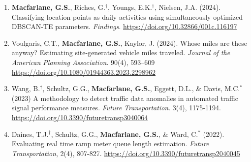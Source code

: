 \documentclass[margin,line]{res}
\newif\ifdetail{}
\newcounter{enuminitialize}
\newenvironment{myenum}[1][]
{%
 \setcounter{enuminitialize}{#1}
 \addtocounter{enuminitialize}{2}
 \begin{enumerate}[left= 4pt, itemsep=8pt, start=\value{enuminitialize}, label=\arabic*\addtocounter{enumi}{-2}]
}
{%
 \end{enumerate}
}
\begin{document}
\begin{resume}
\begin{myenum}[21]

  \item \textbf{Macfarlane, G.S.}, Riches, G.$^\dagger$, Youngs, E.K.$^\dagger$,
  Nielsen, J.A. (2024). Classifying location points as daily activities using
  simultaneously optimized DBSCAN-TE parameters.  \textit{Findings}.
  \url{https://doi.org/10.32866/001c.116197}
  

  \item Voulgaris, C.T., \textbf{Macfarlane, G.S.}, Kaylor, J. (2024).
  Whose miles are these anyway? Estimating site-generated vehicle miles traveled.
  \textit{Journal of the American Planning Association}. 90(4), 593--609 \url{https://doi.org/10.1080/01944363.2023.2298962}


  \item  Wang, B.$^\dagger$, Schultz, G.G., \textbf{Macfarlane, G.S.}, Eggett, D.L., 
  \& Davis, M.C.$^*$ (2023) A methodology to detect traffic data anomalies in automated traffic 
  signal performance measures. \textit{Future Transportation}. 3(4), 1175-1194. \url{https://doi.org/10.3390/futuretransp3040064} 
  

  \item Daines, T.J.$^\dagger$, Schultz, G.G., \textbf{Macfarlane, G.S.}, \&
  Ward, C.$^*$ (2022). Evaluating real time ramp meter queue length estimation.
  \textit{Future Transportation}, 2(4), 807-827. \url{https://doi.org/10.3390/futuretransp2040045}


\end{myenum}
\end{resume}
\end{document}
